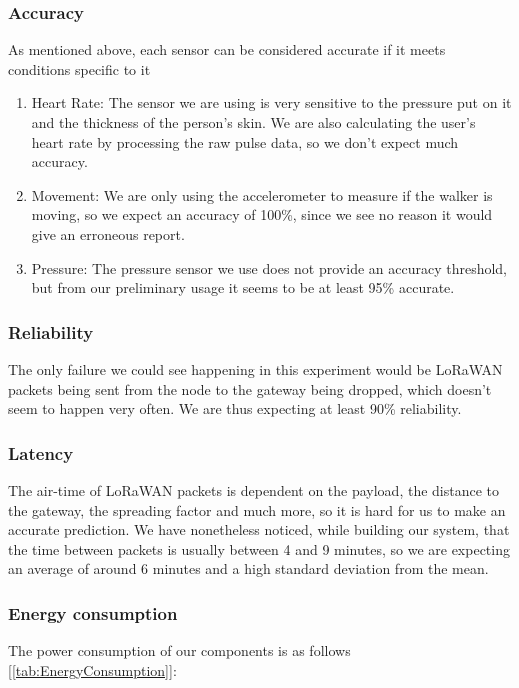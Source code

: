 		\subsubsection*{Accuracy}
			As mentioned above, each sensor can be considered accurate if it meets conditions specific to it 

			\begin{enumerate}
				\item Heart Rate: The sensor we are using is very sensitive to the pressure put on it and the thickness of the person's skin. We are also calculating the user's heart rate by processing the raw pulse data, so we don't expect much accuracy.
				\item Movement: We are only using the accelerometer to measure if the walker is moving, so we expect an accuracy of 100\%, since we see no reason it would give an erroneous report.
				\item Pressure: The pressure sensor we use does not provide an accuracy threshold, but from our preliminary usage it seems to be at least 95\% accurate.
			\end{enumerate}

		\subsubsection*{Reliability}
			The only failure we could see happening in this experiment would be LoRaWAN packets being sent from the node to the gateway being dropped, which doesn't seem to happen very often. We are thus expecting at least 90\% reliability. 

		\subsubsection*{Latency}
			The air-time of LoRaWAN packets is dependent on the payload, the distance to the gateway, the spreading factor and much more, so it is hard for us to make an accurate prediction. We have nonetheless noticed, while building our system, that the time between packets is usually between 4 and 9 minutes, so we are expecting an average of around 6 minutes and a high standard deviation from the mean.
		\newline
		\newline
		\newline
		\subsubsection*{Energy consumption}
			The power consumption of our components is as follows [\ref{tab:EnergyConsumption}]:

